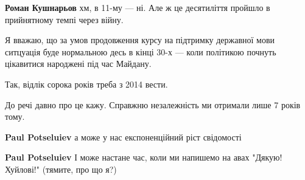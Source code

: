 \begin{itemize}
\begin{itemize}
 
\textbf{Роман Кушнарьов} хм, в 11-му — ні. Але ж це десятиліття пройшло в прийнятному темпі через війну.

Я вважаю, що за умов продовження курсу на підтримку державної мови ситцуація
буде нормальною десь в кінці 30-х — коли політикою почнуть цікавитися народжені
під час Майдану.


 
Так, відлік сорока років треба з 2014 вести.

 
До речі давно про це кажу. Справжню незалежність ми отримали лише 7 років тому.

 
\textbf{Paul Potseluiev} а може у нас експоненційний ріст свідомості

 
\textbf{Paul Potseluiev} І може настане час, коли ми напишемо на авах "Дякую! Хуйлові!" (тямите, про що я?)

 

\end{itemize}
\end{itemize}
